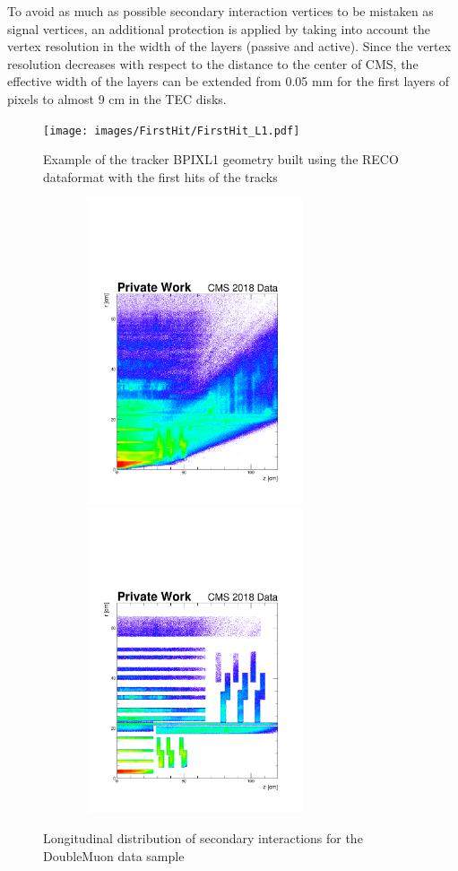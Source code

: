 \documentclass{cernatlasnote}
\begin{document}
To avoid as much as possible secondary interaction vertices to be mistaken as signal vertices, an additional protection is applied by taking into account the vertex resolution in the width of the layers (passive and active). Since the vertex resolution decreases with respect to the distance to the center of CMS, the effective width of the layers can be extended from 0.05 mm for the first layers of pixels to almost 9 cm in the TEC disks.
            
\begin{figure}[ht]
\centering
\texttt{[image: images/FirstHit/FirstHit\_L1.pdf]}
\caption{\label{fig:trackermap} Example of the tracker BPIXL1 geometry built using the RECO dataformat with the first hits of the tracks}
\end{figure}

\begin{figure}[ht]
\centering
\includegraphics[height=9cm, width=9cm, trim= 0cm 0cm 0cm 0.cm,clip]{images/SecInt/DoubleMuon_UL2018_MiniAODv2_GT36-v1_hData_reco_SecInt_rz_Selec.pdf}\includegraphics[height=9cm, width=9cm, trim= 0cm 0cm 0cm 0.cm,clip]{images/SecInt/DoubleMuon_UL2018_MiniAODv2_GT36-v1_hData_reco_SecInt_rz_TrackerMatched.pdf}
\caption{\label{fig:longVeto} Longitudinal distribution of secondary interactions for the DoubleMuon data sample}
\end{figure}
\end{document}

